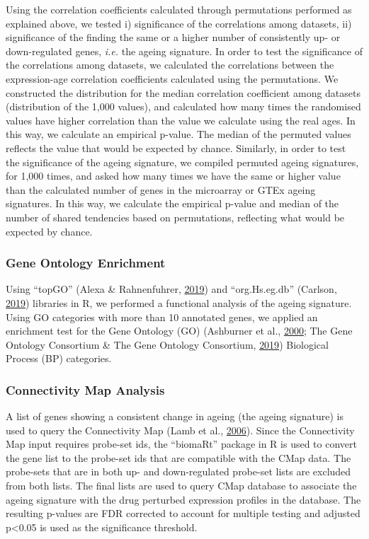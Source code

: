 \documentclass[12pt,twoside]{unicam}
\begin{document}
Using the correlation coefficients calculated through permutations performed as explained above, we tested i) significance of the correlations among datasets, ii) significance of the finding the same or a higher number of consistently up- or down-regulated genes, \emph{i.e.} the ageing signature. In order to test the significance of the correlations among datasets, we calculated the correlations between the expression-age correlation coefficients calculated using the permutations. We constructed the distribution for the median correlation coefficient among datasets (distribution of the 1,000 values), and calculated how many times the randomised values have higher correlation than the value we calculate using the real ages. In this way, we calculate an empirical p-value. The median of the permuted values reflects the value that would be expected by chance. Similarly, in order to test the significance of the ageing signature, we compiled permuted ageing signatures, for 1,000 times, and asked how many times we have the same or higher value than the calculated number of genes in the microarray or GTEx ageing signatures. In this way, we calculate the empirical p-value and median of the number of shared tendencies based on permutations, reflecting what would be expected by chance.

\hypertarget{gene-ontology-enrichment}{%
\subsubsection{Gene Ontology Enrichment}\label{gene-ontology-enrichment}}

Using ``topGO'' (Alexa \& Rahnenfuhrer, \protect\hyperlink{ref-Alexa2019}{2019}) and ``org.Hs.eg.db'' (Carlson, \protect\hyperlink{ref-Carlson2019}{2019}) libraries in R, we performed a functional analysis of the ageing signature. Using GO categories with more than 10 annotated genes, we applied an enrichment test for the Gene Ontology (GO) (Ashburner et al., \protect\hyperlink{ref-Ashburner2000}{2000}; The Gene Ontology Consortium \& The Gene Ontology Consortium, \protect\hyperlink{ref-The_Gene_Ontology_Consortium2019}{2019}) Biological Process (BP) categories.

\hypertarget{drugCMapMethod}{%
\subsubsection{Connectivity Map Analysis}\label{drugCMapMethod}}

A list of genes showing a consistent change in ageing (the ageing signature) is used to query the Connectivity Map (Lamb et al., \protect\hyperlink{ref-Lamb2006}{2006}). Since the Connectivity Map input requires probe-set ids, the ``biomaRt'' package in R is used to convert the gene list to the probe-set ids that are compatible with the CMap data. The probe-sets that are in both up- and down-regulated probe-set lists are excluded from both lists. The final lists are used to query CMap database to associate the ageing signature with the drug perturbed expression profiles in the database. The resulting p-values are FDR corrected to account for multiple testing and adjusted p\textless0.05 is used as the significance threshold.
\end{document}
